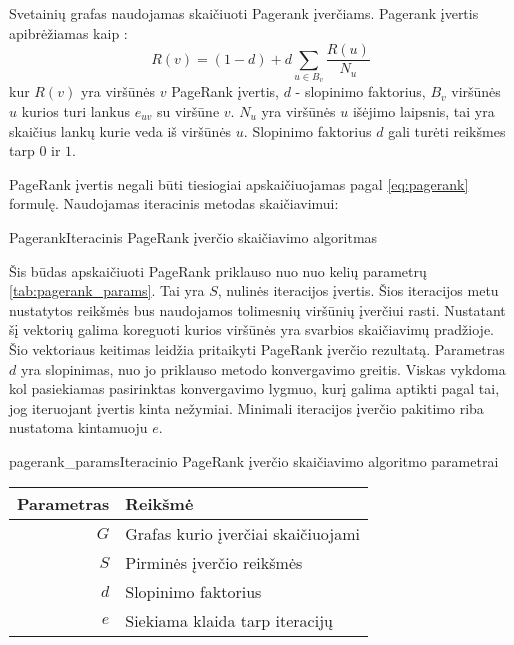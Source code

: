 Svetainių grafas naudojamas skaičiuoti Pagerank įverčiams. Pagerank įvertis apibrėžiamas kaip \cite{pagerank}:
\begin{equation} \label{eq:pagerank}
    R(v) = (1 - d) + d \sum_{u \in B_{v}} \frac{R(u)}{N_u}
\end{equation}
kur $R(v)$ yra viršūnės $v$ PageRank įvertis, $d$ - slopinimo faktorius, $B_v$ viršūnės $u$ kurios turi lankus $e_{uv}$ su viršūne $v$. $N_u$ yra viršūnės $u$ išėjimo laipsnis, tai yra skaičius lankų kurie veda iš viršūnės $u$. Slopinimo faktorius $d$ gali turėti reikšmes tarp $0$ ir $1$.

PageRank įvertis negali būti tiesiogiai apskaičiuojamas pagal \ref{eq:pagerank} formulę. Naudojamas iteracinis metodas  skaičiavimui:

\begin{ktualgo}{Pagerank}{Iteracinis PageRank įverčio skaičiavimo algoritmas}
\Repeat
{}
\EndFor{}
\EndFor{}
\end{ktualgo}

Šis būdas apskaičiuoti PageRank priklauso nuo nuo kelių parametrų \vref{tab:pagerank_params}. Tai yra $S$, nulinės iteracijos įvertis. Šios iteracijos metu nustatytos reikšmės bus naudojamos tolimesnių viršūnių įverčiui rasti. Nustatant šį vektorių galima koreguoti kurios viršūnės yra svarbios skaičiavimų pradžioje. Šio vektoriaus keitimas leidžia pritaikyti PageRank įverčio rezultatą. Parametras $d$ yra slopinimas, nuo jo priklauso metodo konvergavimo greitis. Viskas vykdoma kol pasiekiamas pasirinktas konvergavimo lygmuo, kurį galima aptikti pagal tai, jog iteruojant įvertis kinta nežymiai. Minimali iteracijos įverčio pakitimo riba nustatoma kintamuoju $e$.

\begin{ktutable}{pagerank_params}{Iteracinio PageRank įverčio skaičiavimo algoritmo parametrai}
    \begin{tabular}{ | r | l | }
        \hline
        Parametras & Reikšmė \\ \hline
        $G$ & Grafas kurio įverčiai skaičiuojami \\ \hline
        $S$ & Pirminės įverčio reikšmės \\ \hline
        $d$ & Slopinimo faktorius \\ \hline
        $e$ & Siekiama klaida tarp iteracijų \\ \hline
    \end{tabular}
\end{ktutable}

